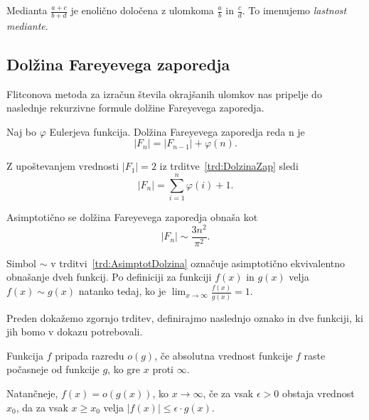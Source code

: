 \documentclass[mat1]{fmfdelo}
\begin{document}
\begin{opomba}
Medianta $\frac{a+c}{b+d}$ je enolično določena z ulomkoma $\frac{a}{b}$ in $\frac{c}{d}$. To imenujemo \emph{lastnost mediante}.
\end{opomba}

%
\subsection{Dolžina Fareyevega zaporedja}

Flitconova metoda za izračun števila okrajšanih ulomkov nas pripelje do naslednje rekurzivne formule dolžine Fareyevega zaporedja.

\begin{trditev}
\label{trd:DolzinaZap}
Naj bo $\varphi$ Eulerjeva funkcija. Dolžina Fareyevega zaporedja reda n je
\[  |F_{n}| = |F_{n-1}| + \varphi(n). \]
\end{trditev}

\begin{opomba}
\label{op:AsimptotDolzina}
Z upoštevanjem vrednosti $|F_{1}| = 2$ iz trditve~\ref{trd:DolzinaZap} sledi \[  |F_{n}| = \sum_{i=1}^n \varphi(i) + 1. \]
\end{opomba}

\begin{trditev}
\label{trd:AsimptotDolzina}
Asimptotično se dolžina Fareyevega zaporedja obnaša kot
\[  |F_{n}|\sim\frac{3n^2}{\pi^2}. \]
\end{trditev}

\begin{opomba}
Simbol $\sim$ v trditvi~\ref{trd:AsimptotDolzina} označuje asimptotično ekvivalentno obnašanje dveh funkcij.
Po definiciji za funkciji $f(x)$ in $g(x)$ velja $f(x) \sim g(x)$ natanko tedaj, ko je $ \lim_{x \to \infty} \frac{f(x)}{g(x)} = 1$.
\end{opomba}

%
Preden dokažemo zgornjo trditev, definirajmo naslednjo oznako in dve funkciji, ki jih bomo v dokazu potrebovali.

\begin{definicija}
Funkcija $f$ pripada razredu $o(g)$, če absolutna vrednost funkcije $f$ raste počasneje od funkcije $g$, ko gre $x$ proti $\infty$.

Natančneje, $f(x) = o \left(g(x) \right)$, ko $x \to \infty$, če za vsak $\epsilon>0$ obstaja vrednost $x_{0}$, da za vsak $x \geq x_{0}$ velja $|f(x)| \leq \epsilon \cdot g(x)$.
\end{definicija}
\end{document}
